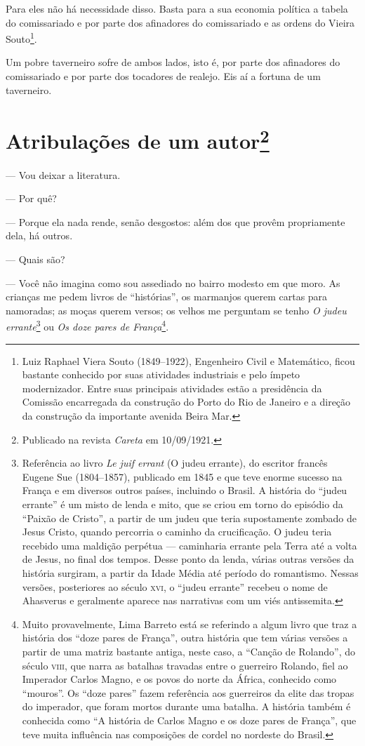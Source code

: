 Para eles não há necessidade disso. Basta para a sua economia política a
tabela do comissariado e por parte dos afinadores do comissariado e as
ordens do Vieira Souto\footnote{Luiz Raphael Viera Souto (1849--1922),
  Engenheiro Civil e Matemático, ficou bastante conhecido por suas
  atividades industriais e pelo ímpeto modernizador. Entre suas
  principais atividades estão a presidência da Comissão encarregada da
  construção do Porto do Rio de Janeiro e a direção da construção da
  importante avenida Beira Mar.}.

Um pobre taverneiro sofre de ambos lados, isto é, por parte dos
afinadores do comissariado e por parte dos tocadores de realejo. Eis aí
a fortuna de um taverneiro.



\chapter[Atribulações de um autor]{Atribulações de um autor\footnote[*]{Publicado na revista \emph{Careta} em 10/09/1921.}}

--- Vou deixar a literatura.

--- Por quê?

--- Porque ela nada rende, senão desgostos: além dos que provêm
propriamente dela, há outros.

--- Quais são?

--- Você não imagina como sou assediado no bairro modesto em que moro. As
crianças me pedem livros de ``histórias'', os marmanjos querem cartas
para namoradas; as moças querem versos; os velhos me perguntam se tenho
\emph{O judeu errante}\footnote{Referência ao livro \emph{Le juif errant}
  (O judeu errante), do escritor francês Eugene Sue (1804--1857),
  publicado em 1845 e que teve enorme sucesso na França e em diversos
  outros países, incluindo o Brasil. A história do ``judeu errante'' é
  um misto de lenda e mito, que se criou em torno do episódio da
  ``Paixão de Cristo'', a partir de um judeu que teria supostamente
  zombado de Jesus Cristo, quando percorria o caminho da crucificação. O
  judeu teria recebido uma maldição perpétua --- caminharia errante pela
  Terra até a volta de Jesus, no final dos tempos. Desse ponto da lenda,
  várias outras versões da história surgiram, a partir da Idade Média
  até período do romantismo. Nessas versões, posteriores ao século \textsc{xvi},
  o ``judeu errante'' recebeu o nome de Ahasverus e geralmente aparece
  nas narrativas com um viés antissemita.} ou \emph{Os doze pares de
França}\footnote{Muito provavelmente, Lima Barreto está se referindo a
  algum livro que traz a história dos ``doze pares de França'', outra
  história que tem várias versões a partir de uma matriz bastante
  antiga, neste caso, a ``Canção de Rolando'', do século \textsc{viii}, que narra
  as batalhas travadas entre o guerreiro Rolando, fiel ao Imperador
  Carlos Magno, e os povos do norte da África, conhecido como
  ``mouros''. Os ``doze pares'' fazem referência aos guerreiros da elite
  das tropas do imperador, que foram mortos durante uma batalha. A
  história também é conhecida como ``A história de Carlos Magno e os
  doze pares de França'', que teve muita influência nas composições de
  cordel no nordeste do Brasil.}.

